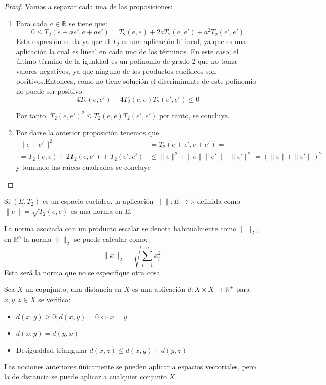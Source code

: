 \noindent
\begin{proof}
Vamos a separar cada una de las proposiciones:
\begin{enumerate}
\item Para cada $a \in \mathbb{R}$ se tiene que: 
\begin{equation*}
0\leq T_2(e+ae',e+ae')=T_2(e,e)+2aT_2(e,e')+a^2T_2(e',e')
\end{equation*}
Esta expresión se da ya que el $T_2$ es una aplicación bilineal, ya que es una aplicación la cual es lineal en cada uno de los términos. En este caso, el último término de la igualdad es un polinomio de grado 2 que no toma valores negativos, ya que ninguno de los productos euclídeos son positivos.Entonces, como no tiene solución el discriminante de este polinomio no puede ser positivo
\begin{equation*}
4 T_2(e,e')-4T_2(e,e)T_2(e',e')\leq 0
\end{equation*}

Por tanto, $T_2(e,e')^2\leq T_2(e,e)T_2(e',e')$ por tanto, se concluye. 
\item Por darse la anterior proposición tenemos que
\begin{align*}
\parallel e+e' \parallel^2 &= T_2(e+e',e+e')=\\
=T_2(e,e)+2T_2(e,e')+T_2(e',e')&\leq \parallel e\parallel^2+\parallel e\parallel\parallel e'\parallel+\parallel e'\parallel^2=(\parallel e\parallel+\parallel e'\parallel)^2
\end{align*}
y tomando las raíces cuadradas se concluye
\end{enumerate}
\end{proof}

\begin{proposition}
Si $(E,T_2)$ es un espacio euclídeo, la aplicación $\parallel\parallel\colon E \longrightarrow \mathbb{R}$ definida como $\parallel e\parallel= \sqrt{T_2(e,e)}$ es una norma en $E$.
\end{proposition}

\noindent
La norma asociada con un producto escalar se denota habitualmente como $\parallel\parallel_2$, en $\mathbb{R}^n$ la norma $\parallel\parallel_2$ se puede calcular como:
$$
\parallel x\parallel_2=\sqrt{\sum_{i=1}^n x_i^2}
$$
\noindent
Esta será la norma que no se especifique otra cosa 

\begin{defi}
Sea $X$ un copnjunto, una distancia en $X$ es una aplicación $d\colon X\times X\longrightarrow \mathbb{R}^+$ para $x,y,z\in X$ se verifica:
\begin{itemize}
\item $d(x,y)\geq 0 ; d(x,y)=0 \Leftrightarrow x=y$
\item $d(x,y)=d(y,x)$
\item Desigualdad triangular $d(x,z)\leq d(x,y)+d(y,z)$
\end{itemize}
\end{defi}

Las nociones anteriores únicamente se pueden aplicar a espacios vectoriales, pero la de distancia se puede aplicar a cualquier conjunto $X$.

